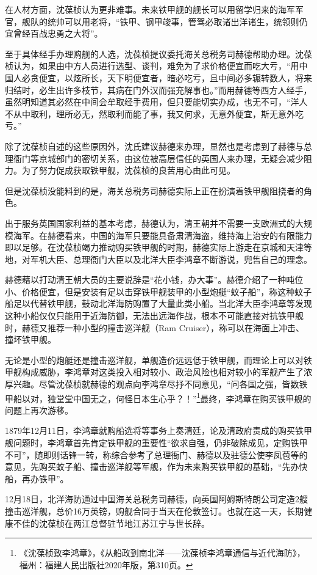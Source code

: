\documentclass[12pt,UTF8]{ctexbook}
\begin{document}
在人材方面，沈葆桢认为更非难事。未来铁甲舰的舰长可以用留学归来的海军军官，舰队的统帅可以用老将，“铁甲、钢甲竣事，管驾必取诸出洋诸生，统领则仍宜曾经百战忠勇之大将”。

至于具体经手办理购舰的人选，沈葆桢提议委托海关总税务司赫德帮助办理。沈葆桢认为，如果由中方人员进行选型、谈判，难免为了求价格便宜而吃大亏，“用中国人必贪便宜，以炫所长，天下明便宜者，暗必吃亏，且中间必多辗转数人，将来归结时，必生出许多枝节，其病在门外汉而强充解事也。”而用赫德等西方人经手，虽然明知道其必然在中间会牟取经手费用，但只要能切实办成，也无不可，“洋人不从中取利，理所必无，然取利而能了事，我又何求，无意外便宜，斯无意外吃亏。”

除了沈葆桢自述的这些原因外，沈氏建议赫德来办理，显然也是考虑到了赫德与总理衙门等京城部门的密切关系，由这位被高层信任的英国人来办理，无疑会减少阻力。为了努力促成获取铁甲舰，沈葆桢的良苦用心由此可见。

但是沈葆桢没能料到的是，海关总税务司赫德实际上正在扮演着铁甲舰阻挠者的角色。

出于服务英国国家利益的基本考虑，赫德认为，清王朝并不需要一支欧洲式的大规模海军。在赫德看来，中国的海军只要能具备肃清海盗，维持海上治安的有限能力即以足够。在沈葆桢竭力推动购买铁甲舰的时期，赫德实际上游走在京城和天津等地，对军机大臣、总理衙门大臣以及北洋大臣李鸿章不断游说，兜售自己的理念。

赫德藉以打动清王朝大员的主要说辞是“花小钱，办大事”。赫德介绍了一种吨位小、价格便宜，但是安装有足以击穿铁甲舰装甲的小型炮艇“蚊子船”，称这种蚊子船足以代替铁甲舰，鼓动北洋海防购置了大量此类小船。当北洋大臣李鸿章等发现这种小船仅仅只能用于近海防御，无法出远海作战，根本不可能直接对抗铁甲舰时，赫德又推荐一种小型的撞击巡洋舰（Ram Cruiser），称可以在海面上冲击、撞坏铁甲舰。

无论是小型的炮艇还是撞击巡洋舰，单舰造价远远低于铁甲舰，而理论上可以对铁甲舰构成威胁，李鸿章对这类投入相对较小、政治风险也相对较小的军舰产生了浓厚兴趣。尽管沈葆桢就赫德的观点向李鸿章尽抒不同意见，“问各国之强，皆数铁甲船以对，独堂堂中国无之，何怪日本生心乎？！”\footnote{《沈葆桢致李鸿章》，《从船政到南北洋——沈葆桢李鸿章通信与近代海防》，福州：福建人民出版社2020年版，第310页。}最终，李鸿章在购买铁甲舰的问题上再次游移。

1879年12月11日，李鸿章就购船选将等事务上奏清廷，论及清政府责成的购买铁甲舰问题时，李鸿章首先肯定铁甲舰的重要性“欲求自强，仍非破除成见，定购铁甲不可”，随即则话锋一转，称综合参考了总理衙门、赫德以及驻德公使李凤苞等的意见，先购买蚊子船、撞击巡洋舰等军舰，作为未来购买铁甲舰的基础，“先办快船，再办铁甲”。

12月18日，北洋海防通过中国海关总税务司赫德，向英国阿姆斯特朗公司定造2艘撞击巡洋舰，总价16万英镑，购舰合同于当天在伦敦签订。也就在这一天，长期健康不佳的沈葆桢在两江总督驻节地江苏江宁与世长辞。
\end{document}
